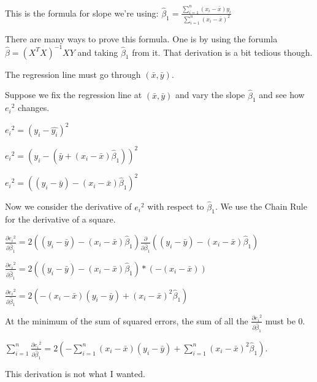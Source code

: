 \documentclass{article}
\begin{document}
This is the formula for slope we're using:
$\hat{\beta}_1=\frac{\sum_{i=1}^{n} (x_i-\bar{x})y_i}{\sum_{i=1}^{n} (x_i-\bar{x})^2}$

There are many ways to prove this formula. One is by using the forumla $\hat{\beta} = (X^T X)^{-1}XY$ and taking $\hat{\beta}_1$ from it.
That derivation is a bit tedious though.

The regression line must go through $(\bar{x}, \bar{y})$. %

Suppose we fix the regression line at $(\bar{x}, \bar{y})$ and vary the slope $\hat{\beta}_1$ and see how ${e_i}^2$ changes.

${e_i}^2=(y_i-\hat{y_i})^2$

${e_i}^2=(y_i-(\bar{y}+(x_i-\bar{x})\hat{\beta}_1))^2$

${e_i}^2=((y_i-\bar{y})-(x_i-\bar{x})\hat{\beta}_1)^2$

Now we consider the derivative of ${e_i}^2$ with respect to $\hat{\beta}_1$. We use the Chain Rule for the derivative of a square.

$\frac{\partial {e_i}^2}{\partial \hat{\beta}_1} = 2((y_i-\bar{y})-(x_i-\bar{x})\hat{\beta}_1)\frac{\partial}{\partial \hat{\beta}_1} ((y_i-\bar{y})-(x_i-\bar{x})\hat{\beta}_1)$

$\frac{\partial {e_i}^2}{\partial \hat{\beta}_1} = 2((y_i-\bar{y})-(x_i-\bar{x})\hat{\beta}_1)*(-(x_i-\bar{x}))$

$\frac{\partial {e_i}^2}{\partial \hat{\beta}_1} = 2(-(x_i-\bar{x})(y_i-\bar{y})+(x_i-\bar{x})^2\hat{\beta}_1)$

At the minimum of the sum of squared errors, the sum of all the $\frac{\partial {e_i}^2}{\partial \hat{\beta}_1}$ must be 0.

$\sum_{i=1}^{n}\frac{\partial {e_i}^2}{\partial \hat{\beta}_1} = 2(-\sum_{i=1}^{n}(x_i-\bar{x})(y_i-\bar{y})+\sum_{i=1}^{n}(x_i-\bar{x})^2\hat{\beta}_1)$.

This derivation is not what I wanted.
\end{document}
